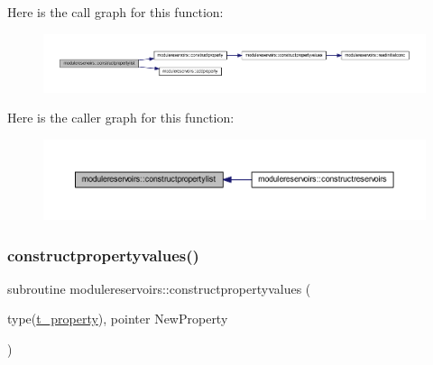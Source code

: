 Here is the call graph for this function\+:\nopagebreak
\begin{figure}[H]
\begin{center}
\leavevmode
\includegraphics[width=350pt]{namespacemodulereservoirs_a96a0b204df7b8cbf62057d7868d8aaa1_cgraph}
\end{center}
\end{figure}
Here is the caller graph for this function\+:\nopagebreak
\begin{figure}[H]
\begin{center}
\leavevmode
\includegraphics[width=350pt]{namespacemodulereservoirs_a96a0b204df7b8cbf62057d7868d8aaa1_icgraph}
\end{center}
\end{figure}
\mbox{\label{namespacemodulereservoirs_a45a6c59f07c2eaae456d1a07476b8b6c}} 
\subsubsection{\texorpdfstring{constructpropertyvalues()}{constructpropertyvalues()}}
{\footnotesize\ttfamily subroutine modulereservoirs\+::constructpropertyvalues (\begin{DoxyParamCaption}\item[{type(\mbox{\hyperlink{structmodulereservoirs_1_1t__property}{t\+\_\+property}}), pointer}]{New\+Property }\end{DoxyParamCaption})\hspace{0.3cm}{\ttfamily [private]}}


